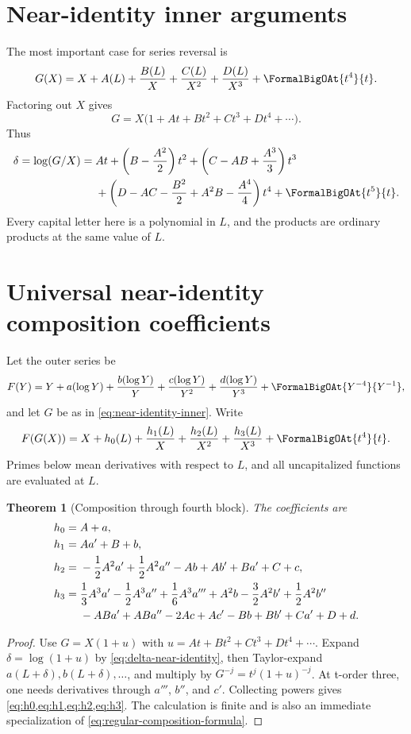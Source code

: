 \documentclass[11pt,openany]{book}
\theoremstyle{definition}
\theoremstyle{plain}
\newtheorem{theorem}{Theorem}[chapter]
\theoremstyle{remark}
\begin{document}
\section{Near-identity inner arguments}
The most important case for series reversal is
\begin{equation}\label{eq:near-identity-inner}
 G(X)=X+A(L)+\frac{B(L)}X+\frac{C(L)}{X^2}
      +\frac{D(L)}{X^3}+\FormalBigOAt{t^4}{t}.
\end{equation}
Factoring out \(X\) gives
\[
 G=X\bigl(1+At+Bt^2+Ct^3+Dt^4+\cdots\bigr).
\]
Thus
\begin{equation}\label{eq:delta-near-identity}
\begin{split}
 \delta=\log(G/X)
 ={}&At+\left(B-\frac{A^2}{2}\right)t^2
 +\left(C-AB+\frac{A^3}{3}\right)t^3\\
 &+\left(D-AC-\frac{B^2}{2}+A^2B-\frac{A^4}{4}\right)t^4
 +\FormalBigOAt{t^5}{t}.
\end{split}
\end{equation}
Every capital letter here is a polynomial in \(L\), and the products are
ordinary products at the same value of \(L\).

\section{Universal near-identity composition coefficients}
Let the outer series be
\begin{equation}\label{eq:outer-near-identity}
 F(Y)=Y+a(\log Y)+\frac{b(\log Y)}Y
 +\frac{c(\log Y)}{Y^2}+\frac{d(\log Y)}{Y^3}
 +\FormalBigOAt{Y^{-4}}{Y^{-1}},
\end{equation}
and let \(G\) be as in \cref{eq:near-identity-inner}.  Write
\[
 F(G(X))=X+h_0(L)+\frac{h_1(L)}X+\frac{h_2(L)}{X^2}
 +\frac{h_3(L)}{X^3}+\FormalBigOAt{t^4}{t}.
\]
Primes below mean derivatives with respect to \(L\), and all uncapitalized
functions are evaluated at \(L\).

\begin{theorem}[Composition through fourth block]\label{thm:near-composition-coeffs}
The coefficients are
\begin{align}
 h_0={}&A+a,\label{eq:h0}\\
 h_1={}&Aa'+B+b,\label{eq:h1}\\
 h_2={}&-\frac12A^2a'+\frac12A^2a''-Ab+Ab'
       +Ba'+C+c,\label{eq:h2}\\
 h_3={}&\frac13A^3a'-\frac12A^3a''+\frac16A^3a'''
       +A^2b-\frac32A^2b'+\frac12A^2b''\notag\\
 &{}-ABa'+ABa''-2Ac+Ac'-Bb+Bb'+Ca'+D+d.
 \label{eq:h3}
\end{align}
\end{theorem}
\begin{proof}
Use \(G=X(1+u)\) with
\(u=At+Bt^2+Ct^3+Dt^4+\cdots\).  Expand
\(\delta=\log(1+u)\) by \cref{eq:delta-near-identity}, then Taylor-expand
\(a(L+\delta),b(L+\delta),\ldots\), and multiply by
\(G^{-j}=t^j(1+u)^{-j}\).  At t-order three, one needs derivatives through
\(a'''\), \(b''\), and \(c'\).  Collecting powers gives
\cref{eq:h0,eq:h1,eq:h2,eq:h3}.  The calculation is finite and is also an
immediate specialization of \cref{eq:regular-composition-formula}.
\end{proof}
\end{document}
